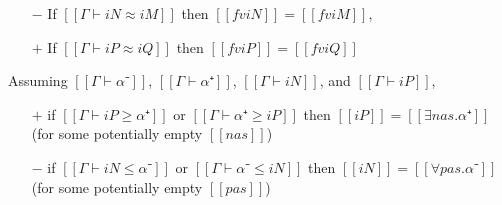 \begin{corollary} \label{corollary:fv-mut-sub}
  \hfill
  \begin{itemize}
    \item [$-$] If $[[Γ ⊢ iN ≈ iM]]$ then $[[fv iN]] = [[fv iM]]$, 
    \item [$+$] If $[[Γ ⊢ iP ≈ iQ]]$ then $[[fv iP]] = [[fv iQ]]$
  \end{itemize}
\end{corollary}

\begin{lemma}
  \label{lemma:var-subt}
  Assuming $[[Γ ⊢  α⁻]]$, $[[Γ ⊢ α⁺]]$, $[[Γ ⊢ iN]]$, and $[[Γ ⊢ iP]]$,
  \begin{itemize}
  \item[$+$] if $[[Γ ⊢ iP ≥ α⁺]]$ or $[[Γ ⊢ α⁺ ≥ iP ]]$ then $[[iP]] = [[∃nas.α⁺]]$ (for some potentially empty $[[nas]]$)
  \item[$-$] if $[[Γ ⊢ iN ≤ α⁻]]$ or $[[Γ ⊢ α⁻ ≤ iN ]]$ then $[[iN]] = [[∀pas.α⁻]]$ (for some potentially empty $[[pas]]$)
  \end{itemize}
\end{lemma}
